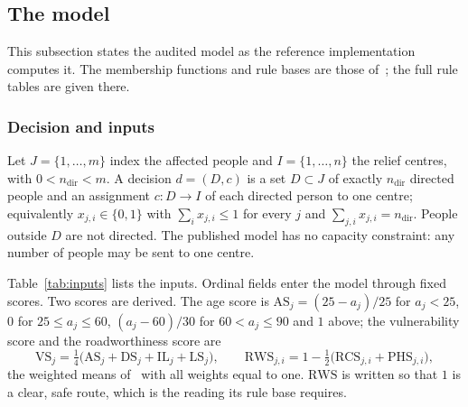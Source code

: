 \subsection{The model}\label{sec:model}
This subsection states the audited model as the reference implementation computes it. The
membership functions and rule bases are those of~\cite{rabiei2026resilient}; the full rule
tables are given there.

\subsubsection{Decision and inputs}
Let $J=\{1,\dots,m\}$ index the affected people and $I=\{1,\dots,n\}$ the relief centres, with
$0<n_{\mathrm{dir}}<m$. A decision $d=(D,c)$ is a set $D\subset J$ of exactly $n_{\mathrm{dir}}$
directed people and an assignment $c\colon D\to I$ of each directed person to one centre;
equivalently $x_{j,i}\in\{0,1\}$ with $\sum_{i}x_{j,i}\le 1$ for every $j$ and
$\sum_{j,i}x_{j,i}=n_{\mathrm{dir}}$. People outside $D$ are not directed. The published model
has no capacity constraint: any number of people may be sent to one centre.

Table~\ref{tab:inputs} lists the inputs. Ordinal fields enter the model through fixed scores.
Two scores are derived. The age score is $\mathrm{AS}_j=(25-a_j)/25$ for $a_j<25$, $0$ for
$25\le a_j\le 60$, $(a_j-60)/30$ for $60<a_j\le 90$ and $1$ above; the vulnerability score and
the roadworthiness score are
\begin{equation}\label{eq:vs-rws}
\mathrm{VS}_j=\tfrac14\bigl(\mathrm{AS}_j+\mathrm{DS}_j+\mathrm{IL}_j+\mathrm{LS}_j\bigr),
\qquad
\mathrm{RWS}_{j,i}=1-\tfrac12\bigl(\mathrm{RCS}_{j,i}+\mathrm{PHS}_{j,i}\bigr),
\end{equation}
the weighted means of~\cite{rabiei2026resilient} with all weights equal to one. $\mathrm{RWS}$
is written so that $1$ is a clear, safe route, which is the reading its rule base requires.

